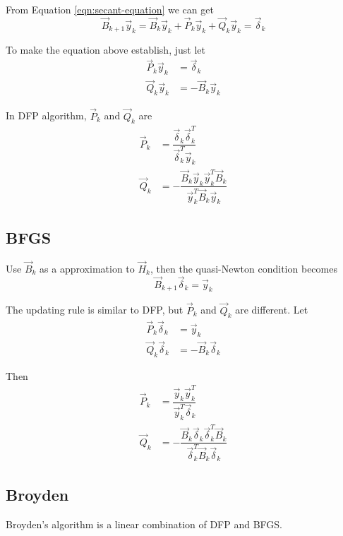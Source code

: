 From Equation \ref{eqn:secant-equation} we can get
\begin{equation*}
\vec{B}_{k+1}\vec{y}_k=\vec{B}_k\vec{y}_k+\vec{P}_k\vec{y}_k+\vec{Q}_k\vec{y}_k=\vec{\delta}_k
\end{equation*}

To make the equation above establish, just let
\begin{align*}
\vec{P}_k\vec{y}_k & = \vec{\delta}_k \\
\vec{Q}_k\vec{y}_k & = -\vec{B}_k\vec{y}_k
\end{align*}

In DFP algorithm, $\vec{P}_k$ and $\vec{Q}_k$ are
\begin{align}
\vec{P}_k &= \dfrac{\vec{\delta}_k\vec{\delta}_k^T}{\vec{\delta}_k^T\vec{y}_k} \\
\vec{Q}_k &= -\dfrac{\vec{B}_k\vec{y}_k\vec{y}_k^T\vec{B}_k}{\vec{y}_k^T\vec{B}_k\vec{y}_k}
\end{align}


\subsection{BFGS}
Use $\vec{B}_k$ as a approximation to $\vec{H}_k$, then the quasi-Newton condition becomes
\begin{equation}
\vec{B}_{k+1}\vec{\delta}_k=\vec{y}_k
\end{equation}

The updating rule is similar to DFP, but $\vec{P}_k$ and $\vec{Q}_k$ are different. Let 
\begin{align*}
\vec{P}_k\vec{\delta}_k & = \vec{y}_k \\
\vec{Q}_k\vec{\delta}_k & = -\vec{B}_k\vec{\delta}_k
\end{align*}

Then
\begin{align}
\vec{P}_k &= \dfrac{\vec{y}_k\vec{y}_k^T}{\vec{y}_k^T\vec{\delta}_k} \\
\vec{Q}_k &= -\dfrac{\vec{B}_k\vec{\delta}_k\vec{\delta}_k^T\vec{B}_k}{\vec{\delta}_k^T\vec{B}_k\vec{\delta}_k}
\end{align}


\subsection{Broyden}
Broyden's algorithm is a linear combination of DFP and BFGS.
